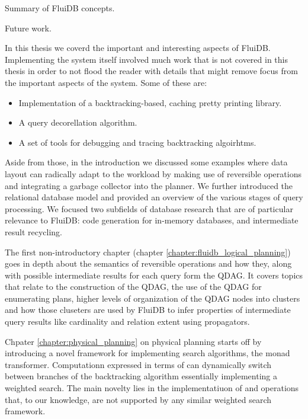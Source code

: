 
\begin{summary}
\item Summary of FluiDB concepts.
\item Future work.
\end{summary}


In this thesis we coverd the important and interesting aspects of
FluiDB. Implementing the system itself involved much work that is not
covered in this thesis in order to not flood the reader with details
that might remove focus from the important aspects of the system. Some
of these are:

\begin{itemize}
\item Implementation of a backtracking-based, caching pretty printing
  library.
\item A query decorellation algorithm.
\item A set of tools for debugging and tracing backtracking
  algoirhtms.
\end{itemize}

Aside from those, in the introduction we discussed some examples where
data layout can radically adapt to the workload by making use of
reversible operations and integrating a garbage collector into the
planner. We further introduced the relational database model and
provided an overview of the various stages of query processing. We
focused two subfields of database research that are of particular
relevance to FluiDB: code generation for in-memory databases, and
intermediate result recycling.

The first non-introductory chapter (chapter
\ref{chapter:fluidb_logical_planning}) goes in depth about the
semantics of reversible operations and how they, along with possible
intermediate results for each query form the QDAG. It covers topics
that relate to the construction of the QDAG, the use of the QDAG for
enumerating plans, higher levels of organization of the QDAG nodes
into clusters and how those cluseters are used by FluiDB to infer
properties of intermediate query results like cardinality and relation
extent using propagators.

Chpater \ref{chapter:physical_planning} on physical planning starts
off by introducing a novel framework for implementing search
algorithms, the  monad transformer. Computationn expressed
in terms of  can dynamically switch between branches of
the backtracking algorithm essentially implementing a weighted
search. The main novelty lies in the implementatiuon of 
and  operations that, to our knowledge, are not
supported by any similar weighted search framework.

